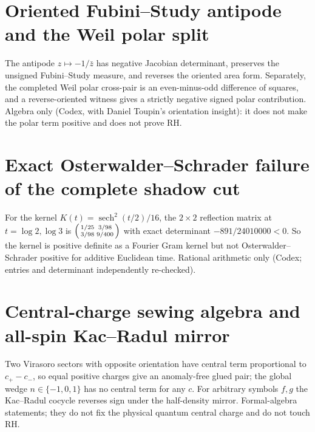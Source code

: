 \documentclass{report}
\theoremstyle{definition}
\begin{document}
\begin{itemize}
\begin{itemize}
\section{Oriented Fubini--Study antipode and the Weil polar split}
The antipode $z\mapsto -1/\bar z$ has negative Jacobian determinant, preserves the unsigned
Fubini--Study measure, and reverses the oriented area form. Separately, the completed Weil
polar cross-pair is an even-minus-odd difference of squares, and a reverse-oriented witness
gives a strictly negative signed polar contribution. Algebra only (Codex, with Daniel Toupin's
orientation insight): it does not make the polar term positive and does not prove RH.

\section{Exact Osterwalder--Schrader failure of the complete shadow cut}
For the kernel $K(t)=\operatorname{sech}^2(t/2)/16$, the $2\times2$ reflection matrix at
$t=\log 2,\log 3$ is $\begin{psmallmatrix}1/25&3/98\\3/98&9/400\end{psmallmatrix}$ with exact
determinant $-891/24010000<0$. So the kernel is positive definite as a Fourier Gram kernel
but not Osterwalder--Schrader positive for additive Euclidean time. Rational arithmetic only
(Codex; entries and determinant independently re-checked).

\section{Central-charge sewing algebra and all-spin Kac--Radul mirror}
Two Virasoro sectors with opposite orientation have central term proportional to
$c_+-c_-$, so equal positive charges give an anomaly-free glued pair; the global wedge
$n\in\{-1,0,1\}$ has no central term for any $c$. For arbitrary symbols $f,g$ the
Kac--Radul cocycle reverses sign under the half-density mirror. Formal-algebra statements;
they do not fix the physical quantum central charge and do not touch RH.


\end{itemize}
\end{itemize}
\end{document}
